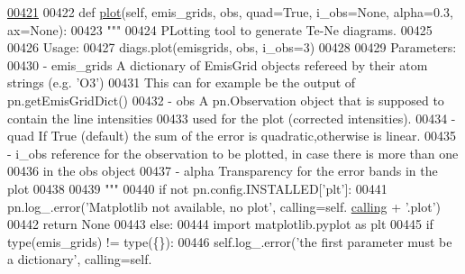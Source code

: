 \begin{DoxyCode}
\hypertarget{classpyneb_1_1core_1_1diags_1_1_diagnostics_l00421}{}\hyperlink{classpyneb_1_1core_1_1diags_1_1_diagnostics_af8b435b5fd63db75d207a7d1327ce65a}{00421} 
00422     \textcolor{keyword}{def }\hyperlink{classpyneb_1_1core_1_1diags_1_1_diagnostics_af8b435b5fd63db75d207a7d1327ce65a}{plot}(self, emis\_grids, obs, quad=True, i\_obs=None, alpha=0.3, ax=None):
00423         \textcolor{stringliteral}{"""}
00424 \textcolor{stringliteral}{        PLotting tool to generate Te-Ne diagrams.}
00425 \textcolor{stringliteral}{        }
00426 \textcolor{stringliteral}{        Usage:}
00427 \textcolor{stringliteral}{            diags.plot(emisgrids, obs, i\_obs=3)}
00428 \textcolor{stringliteral}{            }
00429 \textcolor{stringliteral}{        Parameters:}
00430 \textcolor{stringliteral}{            - emis\_grids    A dictionary of EmisGrid objects refereed by their atom strings (e.g. 'O3')}
00431 \textcolor{stringliteral}{                            This can for example be the output of pn.getEmisGridDict()}
00432 \textcolor{stringliteral}{            - obs           A pn.Observation object that is supposed to contain the line intensities}
00433 \textcolor{stringliteral}{                            used for the plot (corrected intensities).}
00434 \textcolor{stringliteral}{            - quad          If True (default) the sum of the error is quadratic,otherwise is linear.}
00435 \textcolor{stringliteral}{            - i\_obs         reference for the observation to be plotted, in case there is more than one}
00436 \textcolor{stringliteral}{                            in the obs object}
00437 \textcolor{stringliteral}{            - alpha         Transparency for the error bands in the plot}
00438 \textcolor{stringliteral}{            }
00439 \textcolor{stringliteral}{        """}
00440         \textcolor{keywordflow}{if} \textcolor{keywordflow}{not} pn.config.INSTALLED[\textcolor{stringliteral}{'plt'}]: 
00441             pn.log\_.error(\textcolor{stringliteral}{'Matplotlib not available, no plot'}, calling=self.
      \hyperlink{classpyneb_1_1core_1_1diags_1_1_diagnostics_a07dce673fec8b2383ef411ab94b0b2fe}{calling} + \textcolor{stringliteral}{'.plot'})
00442             \textcolor{keywordflow}{return} \textcolor{keywordtype}{None}
00443         \textcolor{keywordflow}{else}:
00444             \textcolor{keyword}{import} matplotlib.pyplot \textcolor{keyword}{as} plt
00445         \textcolor{keywordflow}{if} type(emis\_grids) != type(\{\}):
00446             self.log\_.error(\textcolor{stringliteral}{'the first parameter must be a dictionary'}, calling=self.

\end{DoxyCode}
